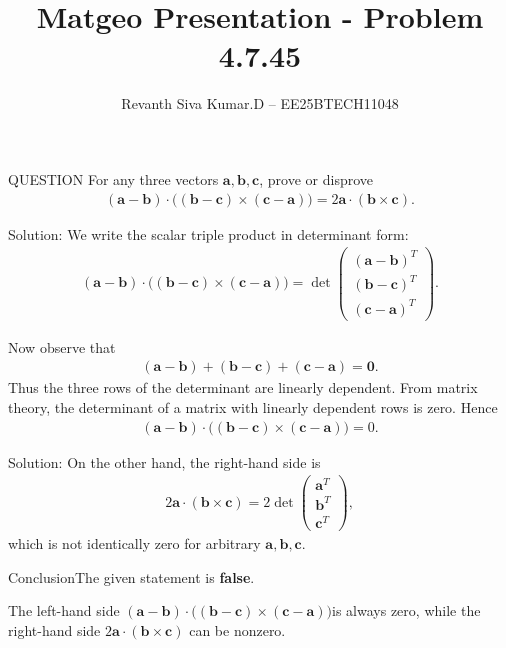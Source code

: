 \documentclass{beamer}
\title{Matgeo Presentation - Problem 4.7.45}
\author{Revanth Siva Kumar.D -- EE25BTECH11048}
\numberwithin{equation}{section}
\newcommand{\myvec}[1]{\ensuremath{\begin{pmatrix}#1\end{pmatrix}}}
\let\vec\mathbf
\begin{document}
\begin{frame}
\titlepage
\end{frame}

\begin{frame}{QUESTION}
For any three vectors $\vec{a},\vec{b},\vec{c}$, prove or disprove
\begin{align*}
    (\vec{a}-\vec{b})\cdot \big((\vec{b}-\vec{c})\times(\vec{c}-\vec{a})\big) = 2\vec{a}\cdot(\vec{b}\times \vec{c}).
\end{align*}\end{frame}

\begin{frame}{Solution:}
We write the scalar triple product in determinant form:
\begin{align}
(\vec{a}-\vec{b})\cdot \big((\vec{b}-\vec{c})\times(\vec{c}-\vec{a})\big)
= \det\myvec{ (\vec{a}-\vec{b})^T \\ (\vec{b}-\vec{c})^T \\ (\vec{c}-\vec{a})^T }.
\end{align}

Now observe that
\begin{align}
(\vec{a}-\vec{b}) + (\vec{b}-\vec{c}) + (\vec{c}-\vec{a}) = \vec{0}.
\end{align}
Thus the three rows of the determinant are linearly dependent. From matrix theory, the determinant of a matrix with linearly dependent rows is zero. Hence
\begin{align}
(\vec{a}-\vec{b})\cdot \big((\vec{b}-\vec{c})\times(\vec{c}-\vec{a})\big) = 0.
\end{align}
\end{frame}
\begin{frame}{Solution:}
On the other hand, the right-hand side is
\begin{align}
2\vec{a}\cdot(\vec{b}\times\vec{c})
= 2\det\myvec{\vec{a}^T \\ \vec{b}^T \\ \vec{c}^T},
\end{align}
which is not identically zero for arbitrary $\vec{a},\vec{b},\vec{c}$.
\end{frame}
\begin{frame}{Conclusion}The given statement is \textbf{false}. 

The left-hand side  $(\vec{a}-\vec{b})\cdot \big((\vec{b}-\vec{c})\times(\vec{c}-\vec{a})\big)$is  always zero, 
while the right-hand side $2\vec{a}\cdot(\vec{b}\times \vec{c})$ can be nonzero.
\end{frame}
\end{document}
